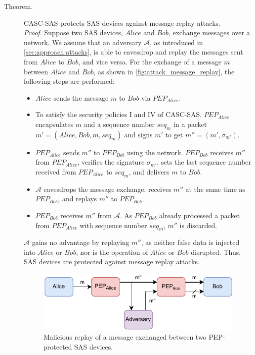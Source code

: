 \begin{description}
    \item[Theorem.] CASC-SAS protects SAS devices against message replay attacks.\\
    \textit{Proof.} Suppose two SAS devices, $Alice$ and $Bob$, exchange messages over a network.
    We assume that an adversary $\mathcal{A}$, as introduced in \autoref{sec:approach:attacks}, is able to eavesdrop and replay the messages sent from $Alice$ to $Bob$, and vice versa.
    For the exchange of a message $m$ between $Alice$ and $Bob$, as shown in \autoref{fig:attack_message_replay}, the following steps are performed:
    \begin{itemize}
        \item $Alice$ sends the message $m$ to $Bob$ via $PEP_{Alice}$.
        \item To satisfy the security policies I and IV of CASC-SAS, $PEP_{Alice}$ encapsulates $m$ and a sequence number $seq_m$ in a packet $m' = (Alice, Bob, m, seq_m)$ and signs $m'$ to get $m'' = (m', \sigma_{m'})$.
        \item $PEP_{Alice}$ sends $m''$ to $PEP_{Bob}$ using the network. $PEP_{Bob}$ receives $m''$ from $PEP_{Alice}$, verifies the signature $\sigma_{m'}$, sets the last sequence number received from $PEP_{Alice}$ to $seq_m$, and delivers $m$ to $Bob$.
        \item $\mathcal{A}$ eavesdrops the message exchange, receives $m''$ at the same time as $PEP_{Bob}$, and replays $m''$ to $PEP_{Bob}$.
        \item $PEP_{Bob}$ receives $m''$ from $\mathcal{A}$. As $PEP_{Bob}$ already processed a packet from $PEP_{Alice}$ with sequence number $seq_m$, $m''$ is discarded.
    \end{itemize}
    $\mathcal{A}$ gains no advantage by replaying $m''$, as neither false data is injected into $Alice$ or $Bob$, nor is the operation of $Alice$ or $Bob$ disrupted.
    Thus, SAS devices are protected against message replay attacks.
    \begin{figure}
        \centering
        \includegraphics[width=0.75\linewidth]{figures/attack_message_replay.drawio.pdf}
        \caption{Malicious replay of a message exchanged between two PEP-protected SAS devices.}
        \label{fig:attack_message_replay}
    \end{figure}


\end{description}

